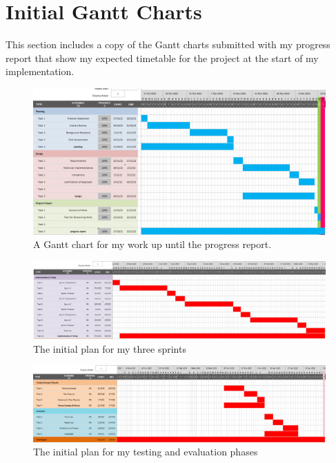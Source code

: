 
\section*{Initial Gantt Charts}\label{app:init-gantt}

This section includes a copy of the Gantt charts submitted with my progress report that show my expected timetable for the project at the start of my implementation.

\begin{figure}[H]
  \includegraphics[width=\textwidth]{assets/images/charts/old-gantt/progress.png}
  \caption{A Gantt chart for my work up until the progress report.}
\end{figure}

\begin{figure}[H]
  \centering
  \includegraphics[width=\textwidth]{assets/images/charts/old-gantt/implementation-testing.png}
  \caption{The initial plan for my three sprints}
\end{figure}

\begin{figure}[H]
  \centering
  \includegraphics[width=\textwidth]{assets/images/charts/old-gantt/testing-evaluation.png}
  \caption{The initial plan for my testing and evaluation phases}
  \label{fig:final-gantt}
\end{figure}